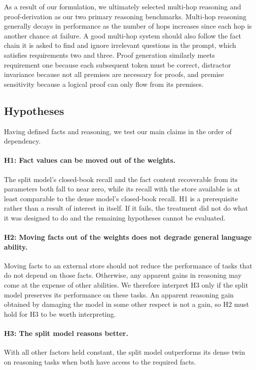 \documentclass{article}
\begin{document}
As a result of our formulation, we ultimately selected multi-hop reasoning and proof-derivation as our two primary reasoning benchmarks. Multi-hop reasoning generally decays in performance as the number of hops increases since each hop is another chance at failure. A good multi-hop system should also follow the fact chain it is asked to find and ignore irrelevant questions in the prompt, which satisfies requirements two and three. Proof generation similarly meets requirement one because each subsequent token must be correct, distractor invariance because not all premises are necessary for proofs, and premise sensitivity because a logical proof can only flow from its premises.

\subsection{Hypotheses}

Having defined facts and reasoning, we test our main claims in the order of dependency.

\paragraph{H1: Fact values can be moved out of the weights.}
The split model's closed-book recall and the fact content recoverable from its parameters both fall to near zero, while its recall with the store available is at least comparable to the dense model's closed-book recall. H1 is a prerequisite rather than a result of interest in itself. If it fails, the treatment did not do what it was designed to do and the remaining hypotheses cannot be evaluated.

\paragraph{H2: Moving facts out of the weights does not degrade general language ability.}
Moving facts to an external store should not reduce the performance of tasks that do not depend on those facts. Otherwise, any apparent gains in reasoning may come at the expense of other abilities. We therefore interpret H3 only if the split model preserves its performance on these tasks. An apparent reasoning gain obtained by damaging the model in some other respect is not a gain, so H2 must hold for H3 to be worth interpreting.

\paragraph{H3: The split model reasons better.}
With all other factors held constant, the split model outperforms its dense twin on reasoning tasks when both have access to the required facts.
\end{document}
